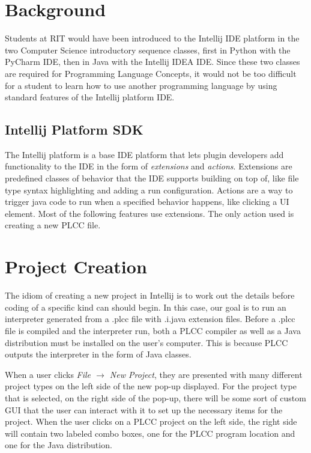\documentclass[conference, letterpaper]{IEEEtran}
\begin{document}
\section{Background}\label{sec:background}
Students at RIT would have been introduced to the Intellij IDE platform in the two Computer Science introductory sequence classes, first in Python with the PyCharm IDE, then in Java with the Intellij IDEA IDE\@.
Since these two classes are required for Programming Language Concepts, it would not be too difficult for a student to learn how to use another programming language by using standard features of the Intellij platform IDE\@.

\subsection{Intellij Platform SDK}\label{subsec:intellij-platform-sdk}
The Intellij platform is a base IDE platform that lets plugin developers add functionality to the IDE in the form of \textit{extensions} and \textit{actions}.
Extensions are predefined classes of behavior that the IDE supports building on top of, like file type syntax highlighting and adding a run configuration.
Actions are a way to trigger java code to run when a specified behavior happens, like clicking a UI element.
Most of the following features use extensions.
The only action used is creating a new PLCC file.


\section{Project Creation}\label{sec:project-creation}
The idiom of creating a new project in Intellij is to work out the details before coding of a specific kind can should begin.
In this case, our goal is to run an interpreter generated from a .plcc file with .i.java extension files.
Before a .plcc file is compiled and the interpreter run, both a PLCC compiler as well as a Java distribution must be installed on the user's computer.
This is because PLCC outputs the interpreter in the form of Java classes.
\par When a user clicks \textit{File $\rightarrow$ New Project}, they are presented with many different project types on the left side of the new pop-up displayed.
For the project type that is selected, on the right side of the pop-up, there will be some sort of custom GUI that the user can interact with it to set up the necessary items for the project.
When the user clicks on a PLCC project on the left side, the right side will contain two labeled combo boxes, one for the PLCC program location and one for the Java distribution.
\end{document}
